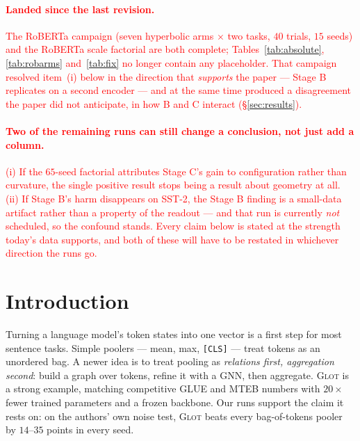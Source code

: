\documentclass{article}
\begin{document}
\paragraph{\textcolor{red}{Landed since the last revision.}}
\textcolor{red}{The RoBERTa campaign (seven hyperbolic arms $\times$ two tasks,
$40$ trials, $15$ seeds) and the RoBERTa scale factorial are both complete;
Tables~\ref{tab:absolute}, \ref{tab:robarms} and~\ref{tab:fix} no longer contain
any placeholder. That campaign resolved item~(i) below in the direction that
\emph{supports} the paper --- Stage B replicates on a second encoder --- and at
the same time produced a disagreement the paper did not anticipate, in how B and
C interact (\S\ref{sec:results}).}

\paragraph{\textcolor{red}{Two of the remaining runs can still change a
conclusion, not just add a column.}}
\textcolor{red}{(i) If the $65$-seed factorial attributes Stage C's gain to
configuration rather than curvature, the single positive result stops being a
result about geometry at all. (ii) If Stage B's harm disappears on SST-2, the
Stage B finding is a small-data artifact rather than a property of the
readout --- and that run is currently \emph{not} scheduled, so the confound
stands. Every claim below is stated at the strength today's data supports, and
both of these will have to be restated in whichever direction the runs go.}

\section{Introduction}

Turning a language model's token states into one vector is a first step for
most sentence tasks. Simple poolers --- mean, max, \texttt{[CLS]} --- treat
tokens as an unordered bag. A newer idea is to treat pooling as \emph{relations
first, aggregation second}: build a graph over tokens, refine it with a GNN,
then aggregate. \textsc{Glot} \citep{mantri2026glot} is a strong example,
matching competitive GLUE and MTEB numbers with $20\times$ fewer trained
parameters and a frozen backbone. Our runs support the claim it rests on: on
the authors' own noise test, \textsc{Glot} beats every bag-of-tokens pooler by
$14$--$35$ points in every seed.
\end{document}
